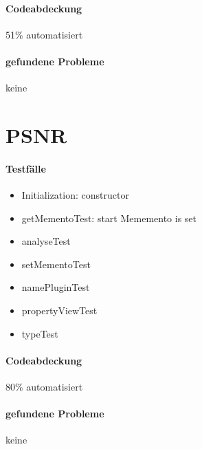 \paragraph*{Codeabdeckung}
51\% automatisiert

\paragraph*{gefundene Probleme}
keine

\section{PSNR}
\paragraph*{Testfälle}
\begin{itemize}
\item Initialization: constructor
\item getMementoTest: start Mememento is set
\item analyseTest
\item setMementoTest
\item namePluginTest
\item propertyViewTest
\item typeTest
\end{itemize}

\paragraph*{Codeabdeckung}
80\% automatisiert

\paragraph*{gefundene Probleme}
keine
